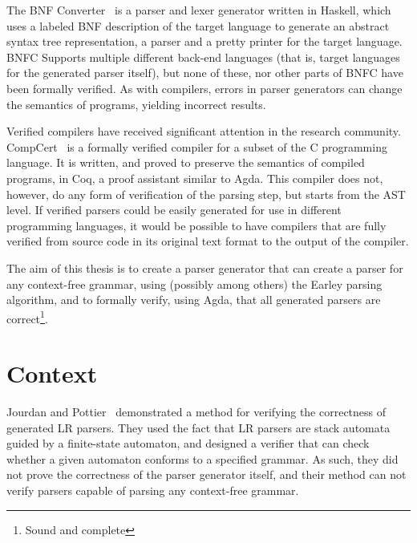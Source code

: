 \documentclass{article}
\begin{document}
	The BNF Converter~\cite{BNFC} is a parser and lexer generator written in
	Haskell, which uses a labeled BNF description of the target language to
	generate an abstract syntax tree representation, a parser and a pretty
	printer for the target language. BNFC Supports multiple different back-end
	languages (that is, target languages for the generated parser itself), but
	none of these, nor other parts of BNFC have been formally verified. As with
	compilers, errors in parser generators can change the semantics of
	programs, yielding incorrect results. 
	
	

	Verified compilers have received significant attention in the research
	community. CompCert~\cite{Leroy} is a formally verified compiler for a
	subset of the C programming language. It is written, and proved to preserve
	the semantics of compiled programs, in Coq, a proof assistant similar to
	Agda. This compiler does not, however, do any form of verification of the
	parsing step, but starts from the AST level. If verified parsers could be
	easily generated for use in different programming languages, it would be
	possible to have compilers that are fully verified from source code in its
	original text format to the output of the compiler.
	
	The aim of this thesis is to create a parser generator that can create a
	parser for any context-free grammar, using (possibly among others) the
	Earley parsing algorithm, and to formally verify, using Agda, that all
	generated parsers are correct\footnote{Sound and complete}. 
	

\section{Context}

	Jourdan and Pottier~\cite{Jourdan} demonstrated a method for verifying the
	correctness of generated LR parsers. They used the fact that LR parsers are
	stack automata guided by a finite-state automaton, and designed a verifier
	that can check whether a given automaton conforms to a specified grammar.
	As such, they did not prove the correctness of the parser generator itself,
	and their method can not verify parsers capable of parsing any context-free
	grammar.
	
\end{document}
